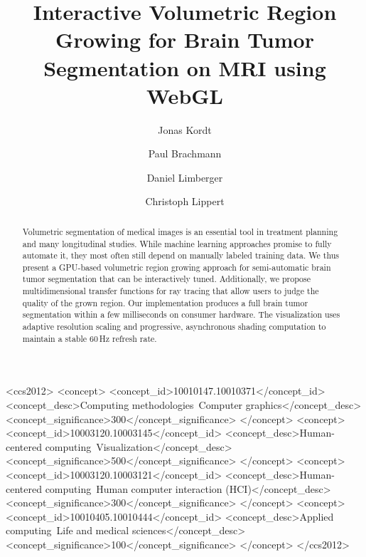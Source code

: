 \documentclass[sigconf]{acmart}
\begin{document}
\title{Interactive Volumetric Region Growing for Brain Tumor Segmentation on MRI using WebGL}

\author{Jonas Kordt}

\author{Paul Brachmann}

\author{Daniel Limberger}

\author{Christoph Lippert}

\begin{abstract}
Volumetric segmentation of medical images is an essential tool in treatment planning and many longitudinal studies. While machine learning approaches promise to fully automate it, they most often still depend on manually labeled training data. We thus present a GPU-based volumetric region growing approach for semi-automatic brain tumor segmentation that can be interactively tuned. Additionally, we propose multidimensional transfer functions for ray tracing that allow users to judge the quality of the grown region. Our implementation produces a full brain tumor segmentation within a few milliseconds on consumer hardware. The visualization uses adaptive resolution scaling and progressive, asynchronous shading computation to maintain a stable 60\,Hz refresh rate.
\end{abstract}

\begin{CCSXML}
<ccs2012>
   <concept>
       <concept_id>10010147.10010371</concept_id>
       <concept_desc>Computing methodologies~Computer graphics</concept_desc>
       <concept_significance>300</concept_significance>
       </concept>
   <concept>
       <concept_id>10003120.10003145</concept_id>
       <concept_desc>Human-centered computing~Visualization</concept_desc>
       <concept_significance>500</concept_significance>
       </concept>
   <concept>
       <concept_id>10003120.10003121</concept_id>
       <concept_desc>Human-centered computing~Human computer interaction (HCI)</concept_desc>
       <concept_significance>300</concept_significance>
       </concept>
   <concept>
       <concept_id>10010405.10010444</concept_id>
       <concept_desc>Applied computing~Life and medical sciences</concept_desc>
       <concept_significance>100</concept_significance>
       </concept>
 </ccs2012>
\end{CCSXML}
\end{document}
